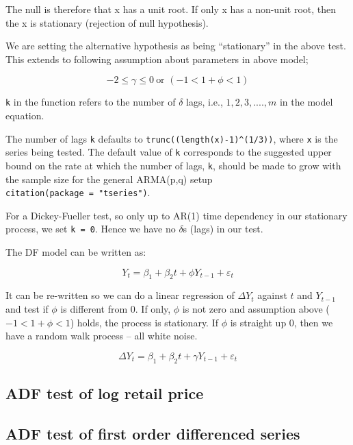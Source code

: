 \documentclass[12pt,]{article}
\begin{document}
The null is therefore that x has a unit root. If only x has a non-unit root, then the x is stationary (rejection of null hypothesis).

We are setting the alternative hypothesis as being ``stationary'' in the above test. This extends to following assumption about parameters in above model;

\[
-2 \leq \gamma \leq 0\ \text{or } (-1 < 1+\phi < 1)
\]

\texttt{k} in the function refers to the number of \(\delta\) lags, i.e., \(1, 2, 3, ...., m\) in the model equation.

The number of lags \texttt{k} defaults to \texttt{trunc((length(x)-1)\^{}(1/3))}, where \texttt{x} is the series being tested. The default value of \texttt{k} corresponds to the suggested upper bound on the rate at which the number of lags, \texttt{k}, should be made to grow with the sample size for the general ARMA(p,q) setup \texttt{citation(package\ =\ "tseries")}.

For a Dickey-Fueller test, so only up to AR(1) time dependency in our stationary process, we set \texttt{k\ =\ 0}. Hence we have no \(\delta\)s (lags) in our test.

The DF model can be written as:

\[
Y_t = \beta_1 + \beta_2 t + \phi Y_{t-1} + \varepsilon_t
\]

It can be re-written so we can do a linear regression of \(\Delta Y_t\) against \(t\) and \(Y_{t-1}\) and test if \(\phi\) is different from 0. If only, \(\phi\) is not zero and assumption above (\(-1 < 1+\phi < 1\)) holds, the process is stationary. If \(\phi\) is straight up 0, then we have a random walk process -- all white noise.

\[
\Delta {Y}_{t}=\beta_1+\beta_2 t+\gamma {Y}_{t-1} + \varepsilon_{t}
\]

\hypertarget{adf-test-of-log-retail-price}{%
\subsection{ADF test of log retail price}\label{adf-test-of-log-retail-price}}

\hypertarget{adf-test-of-first-order-differenced-series}{%
\subsection{ADF test of first order differenced series}\label{adf-test-of-first-order-differenced-series}}
\end{document}

